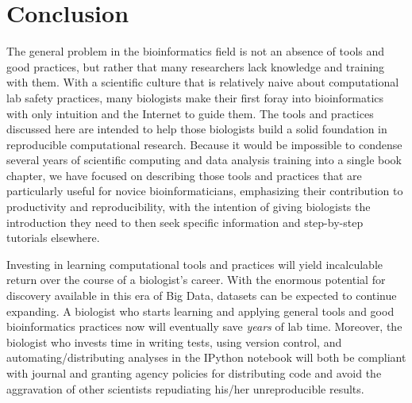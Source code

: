 \documentclass[ChapterTOCs,krantz2]{krantz} %
\begin{document}
\section{Conclusion}\label{conclusion}

The general problem in the
bioinformatics field is not an absence of tools and good practices, but rather
that many researchers lack knowledge and training with them\cite{Merali2010}.  With a scientific
culture that is relatively naive about computational lab safety practices, 
many biologists make their
first foray into bioinformatics with only intuition and the Internet to guide
them.  The tools and practices discussed here are intended to help
those biologists build a solid foundation in reproducible computational
research.  Because it would be impossible to condense several years of
scientific computing and data analysis training into a single book chapter, we
have focused on describing those tools and practices that are particularly
useful for novice bioinformaticians, emphasizing their contribution to 
productivity and reproducibility, with the intention of giving biologists the
introduction they need to then seek specific information and step-by-step
tutorials elsewhere. 

Investing in learning computational tools and practices will yield incalculable
return over the course of a biologist's career.  With the enormous potential
for discovery available in this era of Big Data, datasets can be expected to
continue expanding.  A biologist who starts learning and applying general tools
and good bioinformatics practices now will eventually save \emph{years} of lab time.
Moreover, the biologist who invests time in writing tests, using version
control, and automating/distributing analyses in the IPython notebook will both
be compliant with journal and granting agency policies for distributing code
and avoid the aggravation of other scientists repudiating his/her
unreproducible results.
\end{document}

